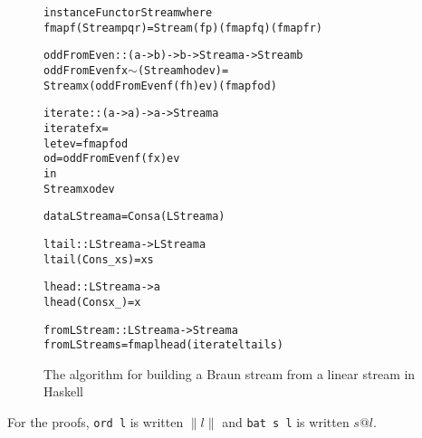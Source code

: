 \documentclass{llncs}
\newcommand{\ord}[1]{\|#1\|}
\begin{document}
\begin{figure}
\begin{alltt}
instance Functor Stream where
    fmap f (Stream p q r) = Stream (f p) (fmap f q) (fmap f r)

oddFromEven :: (a -> b) -> b -> Stream a -> Stream b
oddFromEven f x  \(\sim\)(Stream h od ev) =
    Stream x (oddFromEven f (f h) ev) (fmap f od)

iterate :: (a -> a) -> a -> Stream a
iterate f x =
    let ev = fmap f od
        od = oddFromEven f (f x) ev
    in
      Stream x od ev

data LStream a = Cons a (LStream a)

ltail :: LStream a -> LStream a
ltail (Cons _ xs) = xs

lhead :: LStream a -> a
lhead (Cons x _) = x

fromLStream :: LStream a -> Stream a
fromLStream s = fmap lhead (iterate ltail s)
\end{alltt}
\caption{The algorithm for building a Braun stream from a linear stream in Haskell}
\label{iterateCode}
\end{figure}

For the proofs, \verb|ord l| is written $\ord{l}$ and \verb|bat s l| is written $s@l$.
\end{document}
